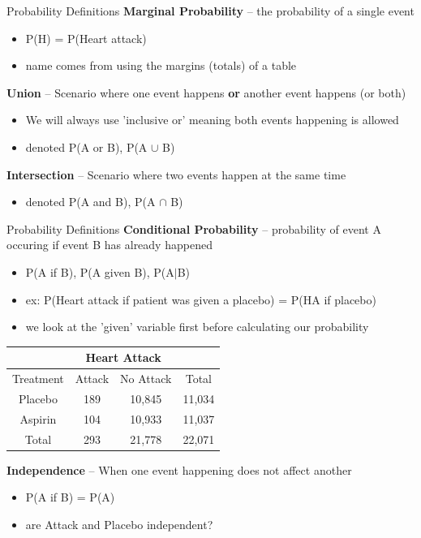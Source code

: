 \documentclass{beamer}
\begin{document}
\begin{frame}{Probability Definitions}
\textbf{Marginal Probability} -- the probability of a single event
\begin{itemize}
    \item P(H) = P(Heart attack)
    \item name comes from using the margins (totals) of a table
\end{itemize}\vspace{8mm}

\textbf{Union} -- 
Scenario where one event happens \textbf{or} another event happens (or both)
\begin{itemize}
    \item We will always use 'inclusive or' meaning both events happening is allowed
    \item denoted P(A or B), P(A $\cup$ B)
\end{itemize} \vspace{8mm}

\textbf{Intersection} -- Scenario where two events happen at the same time
\begin{itemize}
    \item denoted P(A and B), P(A $\cap$ B)
\end{itemize}
\end{frame}

\begin{frame}{Probability Definitions}
\textbf{Conditional Probability} -- probability of event A occuring if event B has already happened
\begin{itemize}
    \item P(A if B), P(A given B), P(A$|$B)
    \item ex: P(Heart attack if patient was given a placebo) = P(HA if placebo)
    \item we look at the 'given' variable first before calculating our probability
\end{itemize}

\begin{table}
    \centering
    \begin{tabular}{|c|c|c|c|} \hline  
         &  \multicolumn{2}{|c|}{Heart Attack}& \\ \hline  
         Treatment&  Attack&  No Attack& Total\\ \hline  
         Placebo&  189&  10,845& 11,034\\ \hline  
         Aspirin&  104&  10,933& 11,037\\ \hline  
         Total&  293&  21,778& 22,071\\ \hline 
    \end{tabular}
\end{table} \vspace{5mm}

\textbf{Independence} -- When one event happening does not affect another
\begin{itemize}
    \item P(A if B) = P(A)
    \item are Attack and Placebo independent?
\end{itemize}
\end{frame}
\end{document}
